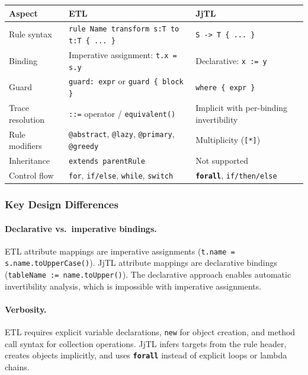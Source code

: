 \documentclass[11pt,a4paper]{article}
\newcommand{\jjtl}{\textsf{JjTL}}
\newcommand{\kw}[1]{\texttt{\textbf{#1}}}
\begin{document}
\begin{center}
\begin{tabularx}{\textwidth}{@{}lXX@{}}
\toprule
\textbf{Aspect} & \textbf{ETL} & \textbf{JjTL} \\
\midrule
Rule syntax & \texttt{rule Name transform s:T to t:T \{ ... \}} & \texttt{S -> T \{ ... \}} \\
Binding & Imperative assignment: \texttt{t.x = s.y} & Declarative: \texttt{x := y} \\
Guard & \texttt{guard: expr} or \texttt{guard \{ block \}} & \texttt{where \{ expr \}} \\
Trace resolution & \texttt{::=} operator / \texttt{equivalent()} & Implicit with per-binding invertibility \\
Rule modifiers & \texttt{@abstract}, \texttt{@lazy}, \texttt{@primary}, \texttt{@greedy} & Multiplicity (\texttt{[*]}) \\
Inheritance & \texttt{extends parentRule} & Not supported \\
Control flow & \texttt{for}, \texttt{if/else}, \texttt{while}, \texttt{switch} & \kw{forall}, \texttt{if/then/else} \\
\bottomrule
\end{tabularx}
\end{center}

\subsubsection{Key Design Differences}

\paragraph{Declarative vs.\ imperative bindings.} ETL attribute mappings are imperative assignments (\texttt{t.name = s.name.toUpperCase()}). \jjtl{} attribute mappings are declarative bindings (\texttt{tableName := name.toUpper()}). The declarative approach enables automatic invertibility analysis, which is impossible with imperative assignments.

\paragraph{Verbosity.} ETL requires explicit variable declarations, \texttt{new} for object creation, and method call syntax for collection operations. \jjtl{} infers targets from the rule header, creates objects implicitly, and uses \kw{forall} instead of explicit loops or lambda chains.
\end{document}
